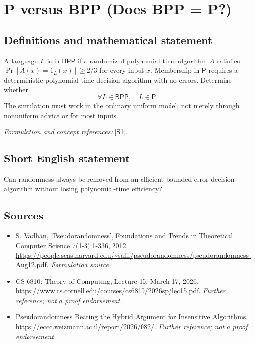 \documentclass[11pt]{article}
\begin{document}
\section*{\texorpdfstring{P versus BPP (Does BPP = P?)}{P versus BPP (Does BPP = P?)}}\label{27}
\subsection{Definitions and mathematical statement}
A language $L$ is in $\mathsf{BPP}$ if a randomized polynomial-time algorithm $A$ satisfies $\Pr[A(x)=1_L(x)]\ge2/3$ for every input $x$. Membership in $\mathsf P$ requires a deterministic polynomial-time decision algorithm with no errors. Determine whether
\[
 \forall L\in\mathsf{BPP},\quad L\in\mathsf P.
\]
The simulation must work in the ordinary uniform model, not merely through nonuniform advice or for most inputs.
\par\smallskip\textit{Formulation and concept references:} \href{https://people.seas.harvard.edu/~salil/pseudorandomness/pseudorandomness-Aug12.pdf}{[S1]}.

\subsection{Short English statement}
Can randomness always be removed from an efficient bounded-error decision algorithm without losing polynomial-time efficiency?
\subsection{Sources}
\begin{itemize}
\item[S1]S. Vadhan, 'Pseudorandomness', Foundations and Trends in Theoretical Computer Science 7(1-3):1-336, 2012.
\url{https://people.seas.harvard.edu/~salil/pseudorandomness/pseudorandomness-Aug12.pdf}.
\textit{Formulation source.}
\item[S2]CS 6810: Theory of Computing, Lecture 15, March 17, 2026.
\url{https://www.cs.cornell.edu/courses/cs6810/2026sp/lec15.pdf}.
\textit{Further reference; not a proof endorsement.}
\item[S3]Pseudorandomness Beating the Hybrid Argument for Insensitive Algorithms.
\url{https://eccc.weizmann.ac.il/report/2026/082/}.
\textit{Further reference; not a proof endorsement.}
\end{itemize}
\end{document}
